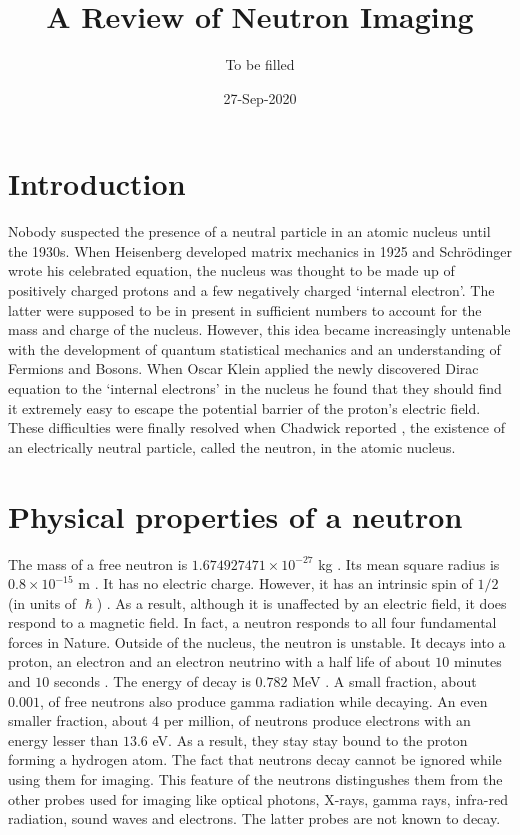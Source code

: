 \documentclass{article}
\title{A Review of Neutron Imaging}
\author{To be filled}
\date{27-Sep-2020}
\numberwithin{equation}{section}
\begin{document}
\maketitle
\section{Introduction}\label{s1}
Nobody suspected the presence of a neutral particle in an atomic nucleus until
the 1930s. When Heisenberg developed matrix mechanics in 1925 and 
Schr\"{o}dinger wrote his celebrated equation, the nucleus was thought to be
made up of positively charged protons and a few negatively charged `internal
electron'. The latter were supposed to be in present in sufficient numbers to
account for the mass and charge of the nucleus. However, this idea became
increasingly untenable with the development of quantum statistical mechanics
and an understanding of Fermions and Bosons. When Oscar Klein 
\cite{klein1929reflexion} applied the newly discovered Dirac equation to the
`internal electrons' in the nucleus he found that they should find it 
extremely easy to escape the potential barrier of the proton's electric field.
These difficulties were finally resolved when Chadwick reported 
\cite{chadwick1932existence}, the existence of an electrically neutral particle, called the neutron, in the atomic nucleus. 

\section{Physical properties of a neutron}\label{s2}
The mass of a free neutron is $1.674927471 \times 10^{-27}$ kg
\cite{taylor2007nist}. Its mean square radius is $0.8 \times 10^{-15}$ m
\cite{bogdan2015particles}. It has no electric charge. However, it has
an intrinsic spin of $1/2$ (in units of $\hslash$)
\cite{basdevant2005fundamentals}. As a result, although it is unaffected by 
an electric field, it does respond to a magnetic field. In fact, a neutron 
responds to all four fundamental forces in Nature. Outside of
the nucleus, the neutron is unstable. It decays into a proton, an electron and
an electron neutrino with a half life of about $10$ minutes and $10$ seconds
\cite{Nakamura_2010}. The energy of decay is $0.782$ MeV \cite{heyde2004basic}.
A small fraction, about $0.001$, of free neutrons also produce gamma radiation 
while decaying. An even smaller fraction, about $4$ per million, of neutrons
produce electrons with an energy lesser than $13.6$ eV. As a result, they
stay stay bound to the proton forming a hydrogen atom. The fact that neutrons
decay cannot be ignored while using them for imaging. This feature of the
neutrons distingushes them from the other probes used for imaging like optical
photons, X-rays, gamma rays, infra-red radiation, sound waves and electrons. 
The latter probes are not known to decay.
\end{document}
